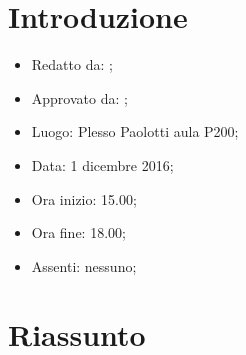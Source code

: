 \section{Introduzione}

	\begin{itemize}
		\item Redatto da: \DS;
		\item Approvato da: \AS;
		\item Luogo: Plesso Paolotti aula P200;
		\item Data: 1 dicembre 2016;
		\item Ora inizio: 15.00;
		\item Ora fine: 18.00;
		\item Assenti: nessuno;		
	\end{itemize}

\section{Riassunto}
